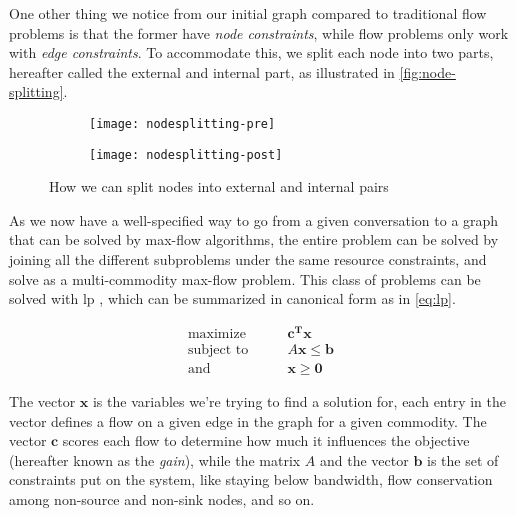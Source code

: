 One other thing we notice from our initial graph compared to traditional flow problems is that the former have \emph{node constraints}, while flow problems only work with \emph{edge constraints}. To accommodate this, we split each node into two parts, hereafter called the external and internal part, as illustrated in \autoref{fig:node-splitting}.

\begin{figure}
    \centering
    \begin{subfigure}[t]{.48\textwidth}
        \centering
        \texttt{[image: nodesplitting-pre]}
    \end{subfigure}
    \hfill
    \begin{subfigure}[t]{.48\textwidth}
        \centering
        \texttt{[image: nodesplitting-post]}
    \end{subfigure}
    \caption{How we can split nodes into external and internal pairs}
    \label{fig:node-splitting}
\end{figure}

As we now have a well-specified way to go from a given conversation to a graph that can be solved by max-flow algorithms, the entire problem can be solved by joining all the different subproblems under the same resource constraints, and solve as a multi-commodity max-flow problem. This class of problems can be solved with \acrfull{lp} \cite{ahuja1988network}, which can be summarized in canonical form as in \autoref{eq:lp}.

\begin{align}\label{eq:lp}
    \text{maximize}\qquad &\mathbf{c^Tx} \\
    \text{subject to}\qquad &A\mathbf{x} \leq \mathbf{b} \nonumber \\
    \text{and}\qquad &\mathbf{x} \geq \mathbf{0} \nonumber
\end{align}

The vector $\mathbf{x}$ is the variables we're trying to find a solution for, each entry in the vector defines a flow on a given edge in the graph for a given commodity. The vector $\mathbf{c}$ scores each flow to determine how much it influences the objective (hereafter known as the \emph{gain}), while the matrix $A$ and the vector $\mathbf{b}$ is the set of constraints put on the system, like staying below bandwidth, flow conservation among non-source and non-sink nodes, and so on.

